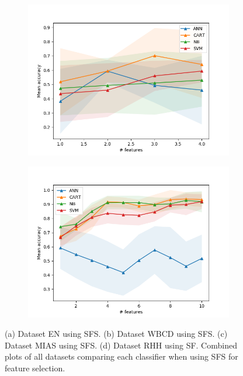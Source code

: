 \begin{figure}[htbp]
  \begin{subfigure}[b]{0.475\textwidth}
      \centering
      \includegraphics[width=\textwidth]{../plots_with_std_fill/Data_mias_sf_combined.png}
      \caption[]%
      {{\small}}
      \label{fig:MIAS_sfs}
  \end{subfigure}
  \quad
  \begin{subfigure}[b]{0.475\textwidth}
      \centering
      \includegraphics[width=\textwidth]{../plots_with_std_fill/FNA_gb_sf_combined.png}
      \caption[]%
      {{\small}}
      \label{fig:RHH_sfs}
  \end{subfigure}
  \caption[]
  {{\small (a) Dataset EN using SFS. (b) Dataset WBCD using SFS. (c) Dataset MIAS using SFS. (d) Dataset RHH using SF. Combined plots of all datasets comparing each classifier when using SFS for feature selection.}}
  \label{fig:plots_sfs}
\end{figure}
